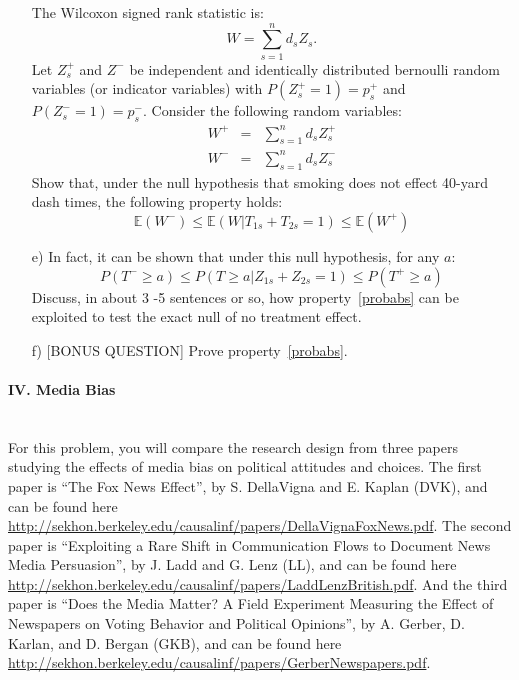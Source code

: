 \documentclass{article}
\newcommand{\E}[0]{\mathbb{E}}
\begin{document}
\begin{itemize}
          The Wilcoxon signed rank statistic is:
          $$
            W = \sum_{s=1}^n d_sZ_s.
          $$
          Let $Z^+_s$ and $Z^-$ be independent and identically distributed 
          bernoulli random variables (or indicator variables) with $P(Z^+_s = 1) = p^+_s$
          and $P(Z^-_s = 1) = p^-_s$.
          Consider the following random variables:
          \begin{eqnarray*}
            W^+ &=& \sum_{s=1}^n d_s Z^+_s \\
            W^- & = & \sum_{s=1}^n d_sZ^-_s
          \end{eqnarray*}
          Show that, under the null hypothesis that smoking does not effect 40-yard dash times, 
          the following property holds:
          $$
           \E(W^-)\leq  \E(W| T_{1s} + T_{2s} =1) \leq \E(W^+) 
          $$
        \item[e)]
          In fact, it can be shown that under this null hypothesis, for any $a$:
          \begin{equation}
            P(T^- \geq a) \leq P(T \geq a | Z_{1s} + Z_{2s} = 1) \leq P(T^+ \geq a)
            \label{probabs}
          \end{equation}
          Discuss, in about 3 -5 sentences or so, how property~\eqref{probabs} can be
          exploited to test the exact null of no treatment effect. 
        \item[f)] [BONUS QUESTION]
          Prove property~\eqref{probabs}. 
      \end{itemize}

\paragraph{\Large IV. Media Bias \\ \\}

For this problem, you will compare the research design from three
papers studying the effects of media bias on political attitudes and
choices.  The first paper is ``The Fox News Effect'', by S.
DellaVigna and E. Kaplan (DVK), and can be found here
\url{http://sekhon.berkeley.edu/causalinf/papers/DellaVignaFoxNews.pdf}. The
second paper is ``Exploiting a Rare Shift in Communication Flows to
Document News Media Persuasion'', by J. Ladd and G. Lenz (LL),
and can be found here
\url{http://sekhon.berkeley.edu/causalinf/papers/LaddLenzBritish.pdf}. And
the third paper is ``Does the Media Matter? A Field Experiment
Measuring the Effect of Newspapers on Voting Behavior and Political
Opinions'', by A. Gerber, D. Karlan, and D. Bergan (GKB), and
can be found here
\url{http://sekhon.berkeley.edu/causalinf/papers/GerberNewspapers.pdf}.
\end{document}
